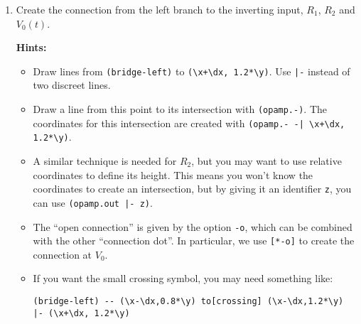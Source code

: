 \begin{enumerate}
\begin{enumerate}
        \item Create the connection from the left branch to the inverting input, $R_1$, $R_2$ and $V_0(t)$.
        
        \textbf{Hints:}
        \begin{itemize}
            \item Draw lines from \texttt{(bridge-left)} to \verb|(\x+\dx, 1.2*\y)|. Use \verb!|-! instead of two discreet lines.
            \item Draw a line from this point to its intersection with \verb|(opamp.-)|. The coordinates for this intersection are created with \verb!(opamp.- -| \x+\dx, 1.2*\y)!.
            \item A similar technique is needed for \( R_2 \), but you may want to use relative coordinates to define its height. This means you won't know the coordinates to create an intersection, but by giving it an identifier \verb|z|, you can use \verb!(opamp.out |- z)!.
            \item The ``open connection'' is given by the option \verb|-o|, which can be combined with the other ``connection dot''. In particular, we use \verb|[*-o]| to create the connection at \( V_0 \). 
            \item If you want the small crossing symbol, you may need something like:
            \begin{lstlisting}
(bridge-left) -- (\x-\dx,0.8*\y) to[crossing] (\x-\dx,1.2*\y) |- (\x+\dx, 1.2*\y)
            \end{lstlisting}
        \end{itemize}
    \end{enumerate}
\end{enumerate}